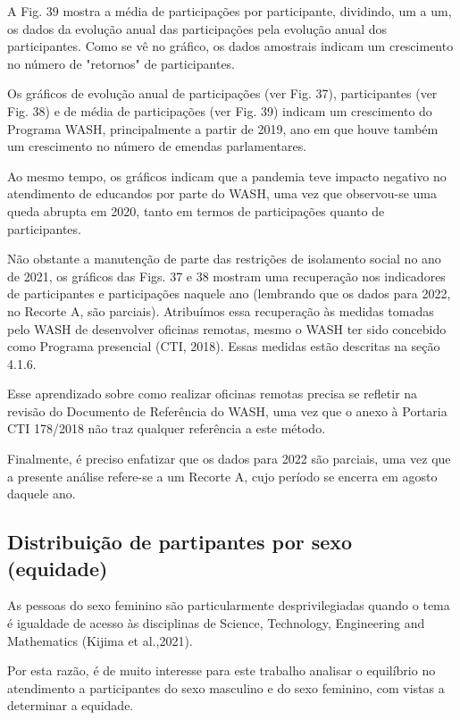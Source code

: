 A Fig. 39 mostra a média de participações por participante, dividindo, um a um, os dados da evolução anual das participações pela evolução anual dos participantes. Como se vê no gráfico, os dados amostrais indicam um crescimento no número de "retornos" de participantes.

Os gráficos de evolução anual de participações (ver Fig. 37), participantes (ver Fig. 38) e de média de participações (ver Fig. 39) indicam um crescimento do Programa WASH, principalmente a partir de 2019, ano em que houve também um crescimento no número de emendas parlamentares.

Ao mesmo tempo, os gráficos indicam que a pandemia teve impacto negativo no atendimento de educandos por parte do WASH, uma vez que observou-se uma queda abrupta em 2020, tanto em termos de participações quanto de participantes.

Não obstante a manutenção de parte das restrições de isolamento social no ano de 2021, os gráficos das Figs. 37 e 38 mostram uma recuperação nos indicadores de participantes e participações naquele ano (lembrando que os dados para 2022, no Recorte A, são parciais). Atribuímos essa recuperação às medidas tomadas pelo WASH de desenvolver oficinas remotas, mesmo o WASH ter sido concebido como Programa presencial  (CTI, 2018). Essas medidas estão descritas na seção 4.1.6.

Esse aprendizado sobre como realizar oficinas remotas precisa se refletir na revisão do Documento de Referência do WASH, uma vez que o anexo à Portaria CTI 178/2018 não traz qualquer referência a este método.

Finalmente, é preciso enfatizar que os dados para 2022 são parciais, uma vez que a presente análise refere-se a um Recorte A, cujo período se encerra em agosto daquele ano.

\subsection[Distribuição de partipantes por sexo (equidade)]{Distribuição de partipantes por sexo (equidade)}\label{Distribuição de partipantes por sexo (equidade)}
As pessoas do sexo feminino são particularmente desprivilegiadas quando o tema é igualdade de acesso às disciplinas de Science, Technology, Engineering and Mathematics (Kijima et al.,2021).

Por esta razão, é de muito interesse para este trabalho analisar o equilíbrio no atendimento a participantes do sexo masculino e do sexo feminino, com vistas a determinar a equidade.

